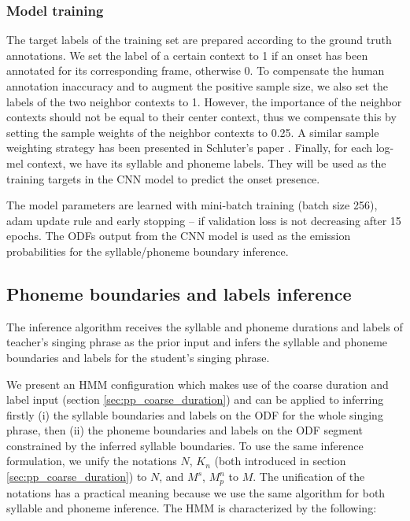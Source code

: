 \subsubsection{Model training}

The target labels of the training set are prepared according to the ground truth annotations. We set the label of a certain context to 1 if an onset has been annotated for its corresponding frame, otherwise 0. To compensate the human annotation inaccuracy and to augment the positive sample size, we also set the labels of the two neighbor contexts to 1. However, the importance of the neighbor contexts should not be equal to their center context, thus we compensate this by setting the sample weights of the neighbor contexts to 0.25. A similar sample weighting strategy has been presented in Schluter's paper \cite{Schluter2014}. Finally, for each log-mel context, we have its syllable and phoneme labels. They will be used as the training targets in the CNN model to predict the onset presence.

The model parameters are learned with mini-batch training (batch size 256), adam \cite{kingma2014adam} update rule and early stopping -- if validation loss is not decreasing after 15 epochs. The ODFs output from the CNN model is used as the emission probabilities for the syllable/phoneme boundary inference.

\subsection{Phoneme boundaries and labels inference}\label{sec:ch5:dur_label}

The inference algorithm receives the syllable and phoneme durations and labels of teacher's singing phrase as the prior input and infers the syllable and phoneme boundaries and labels for the student's singing phrase.

We present an HMM configuration which makes use of the coarse duration and label input (section \ref{sec:pp_coarse_duration}) and can be applied to inferring firstly (i) the syllable boundaries and labels on the ODF for the whole singing phrase, then (ii) the phoneme boundaries and labels on the ODF segment constrained by the inferred syllable boundaries. To use the same inference formulation, we unify the notations $N$, $K_n$ (both introduced in section \ref{sec:pp_coarse_duration}) to $N$, and $M^s$, $M^{n}_{p}$ to $M$. The unification of the notations has a practical meaning because we use the same algorithm for both syllable and phoneme inference. The HMM is characterized by the following:


